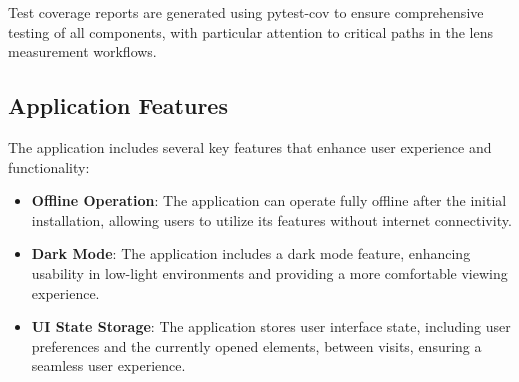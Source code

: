 Test coverage reports are generated using pytest-cov to ensure comprehensive testing of all components, with particular attention to critical paths in the lens measurement workflows.

\subsection{Application Features}
The application includes several key features that enhance user experience and functionality:
\begin{itemize}
    \item \textbf{Offline Operation}: The application can operate fully offline after the initial installation, allowing users to utilize its features without internet connectivity.
    \item \textbf{Dark Mode}: The application includes a dark mode feature, enhancing usability in low-light environments and providing a more comfortable viewing experience.
    \item \textbf{UI State Storage}: The application stores user interface state, including user preferences and the currently opened elements, between visits, ensuring a seamless user experience.
\end{itemize}
